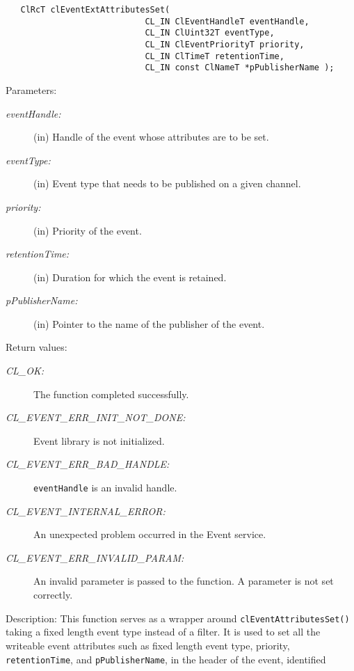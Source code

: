 \begin{flushleft}
\begin{Desc}
\footnotesize\begin{verbatim}   ClRcT clEventExtAttributesSet(
              				CL_IN ClEventHandleT eventHandle,
              				CL_IN ClUint32T eventType,
              				CL_IN ClEventPriorityT priority,
              				CL_IN ClTimeT retentionTime,
              				CL_IN const ClNameT *pPublisherName );
\end{verbatim}
\normalsize
\end{Desc}
\begin{Desc}
\item[Parameters:]
\begin{description}
\item[{\em event\-Handle:}](in) Handle of the event whose attributes are to be set. 
\item[{\em event\-Type:}](in) Event type that needs to be published on a given channel. 
\item[{\em priority:}](in) Priority of the event. 
\item[{\em retention\-Time:}](in) Duration for which the event is retained. 
\item[{\em p\-Publisher\-Name:}](in) Pointer to the name of the publisher of the event.
\end{description}
\end{Desc}
\begin{Desc}
\item[Return values:]
\begin{description}
\item[{\em CL\_\-OK:}]The function completed successfully. 
\item[{\em CL\_\-EVENT\_\-ERR\_\-INIT\_\-NOT\_\-DONE:}]Event library is not initialized. 
\item[{\em CL\_\-EVENT\_\-ERR\_\-BAD\_\-HANDLE:}]{\tt{eventHandle}} is an invalid handle. 
\item[{\em CL\_\-EVENT\_\-INTERNAL\_\-ERROR:}]An unexpected problem occurred in the Event service. 
\item[{\em CL\_\-EVENT\_\-ERR\_\-INVALID\_\-PARAM:}]An invalid parameter is passed to the function. A parameter is not set correctly.
\end{description}
\end{Desc}
\begin{Desc}
\item[Description:]
	This function serves as a wrapper around {\tt{clEventAttributesSet()}} taking a fixed length event type instead of a filter. It is used to set all the 
	writeable event attributes such as fixed length event type, priority, {\tt{retentionTime}}, and {\tt{pPublisherName}}, in the header of the event, identified

\end{Desc}
\end{flushleft}
